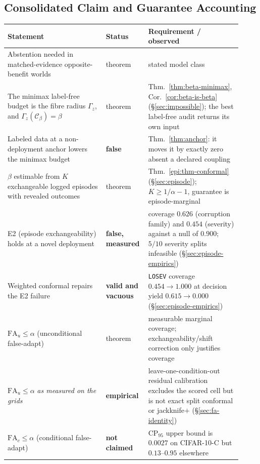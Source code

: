 \subsection{Consolidated Claim and Guarantee Accounting}\label{sec:guarantees}
\begin{center}
\scriptsize
\renewcommand{\arraystretch}{1.12}
\setlength{\tabcolsep}{4pt}
\begin{tabular}{@{}p{0.40\linewidth}p{0.14\linewidth}p{0.38\linewidth}@{}}
\toprule
Statement & Status & Requirement / observed \\
\midrule
Abstention needed in matched-evidence opposite-benefit worlds & theorem & stated model class \\
The minimax label-free budget is the fibre radius $\Gamma_z$, and $\Gamma_z(\mathcal C_\beta)=\beta$ & theorem & Thm.~\ref{thm:beta-minimax}, Cor.~\ref{cor:beta-is-beta} (\S\ref{sec:impossible}); the best label-free audit returns its own input \\
Labeled data at a non-deployment anchor lowers the minimax budget & \textbf{false} & Thm.~\ref{thm:anchor}: it moves it by exactly zero absent a declared coupling \\
$\beta$ estimable from $K$ exchangeable logged episodes with revealed outcomes & theorem & Thm.~\ref{epi:thm-conformal} (\S\ref{sec:episode}); $K\ge1/\alpha-1$, guarantee is episode-marginal \\
E2 (episode exchangeability) holds at a novel deployment & \textbf{false, measured} & coverage $0.626$ (corruption family) and $0.454$ (severity) against a null of $0.900$; $5/10$ severity splits infeasible (\S\ref{sec:episode-empirics}) \\
Weighted conformal repairs the E2 failure & \textbf{valid and vacuous} & \texttt{LOSEV} coverage $0.454\to1.000$ at decision yield $0.615\to0.000$ (\S\ref{sec:episode-empirics}) \\
$\mathrm{FA}_u \le \alpha$ (unconditional false-adapt) & theorem & measurable marginal coverage; exchangeability/shift correction only justifies coverage \\
$\mathrm{FA}_u \le \alpha$ \emph{as measured on the grids} & \textbf{empirical} & leave-one-condition-out residual calibration excludes the scored cell but is not exact split conformal or jackknife$+$ (\S\ref{sec:fa-identity}) \\
$\mathrm{FA}_c \le \alpha$ (conditional false-adapt) & \textbf{not claimed} & CP$_{95}$ upper bound is $0.0027$ on CIFAR-10-C but $0.13$--$0.95$ elsewhere \\

\end{tabular}
\end{center}
